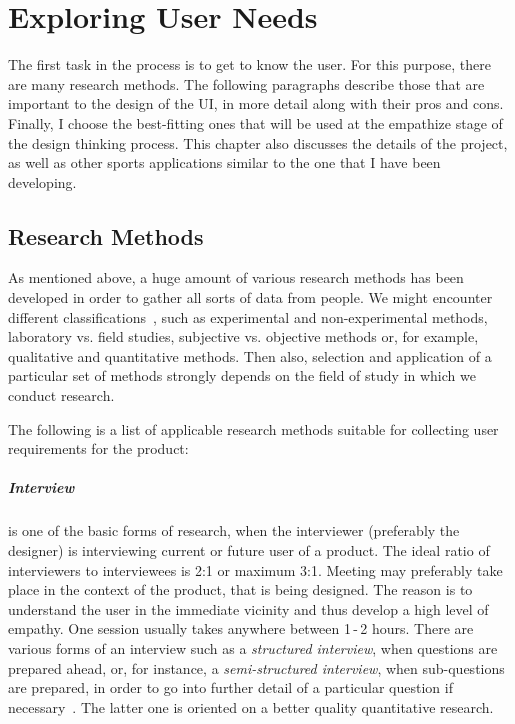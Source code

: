 \chapter{Exploring User Needs}\label{research}
The first task in the process is to get to know the user. For this purpose, there are many research methods. The following paragraphs describe those that are important to the design of the UI, in more detail along with their pros and cons. Finally, I choose the best-fitting ones that will be used at the empathize stage of the design thinking process. This chapter also discusses the details of the project, as well as other sports applications similar to the one that I have been developing.

\section{Research Methods}
As mentioned above, a huge amount of various research methods has been developed in order to gather all sorts of data from people. We might encounter different classifications~\cite{Bordens}, such as experimental and non-experimental methods, laboratory vs. field studies, subjective vs. objective methods or, for example, qualitative and quantitative methods. Then also, selection and application of a particular set of methods strongly depends on the field of study in which we conduct research.

The following is a list of applicable research methods suitable for collecting user requirements for the product:

\paragraph{Interview}
is one of the basic forms of research, when the interviewer (preferably the designer) is interviewing current or future user of a product. The ideal ratio of interviewers to interviewees is 2:1 or maximum 3:1. Meeting may preferably take place in the context of the product, that is being designed. The reason is to understand the user in the immediate vicinity and thus develop a high level of empathy. One session usually takes anywhere between 1\,-\,2 hours. There are various forms of an interview such as a \textit{structured interview}, when questions are prepared ahead, or, for instance, a \textit{semi-structured interview}, when sub-questions are prepared, in order to go into further detail of a particular question if necessary~\cite{Dix}. The latter one is oriented on a better quality quantitative research.

